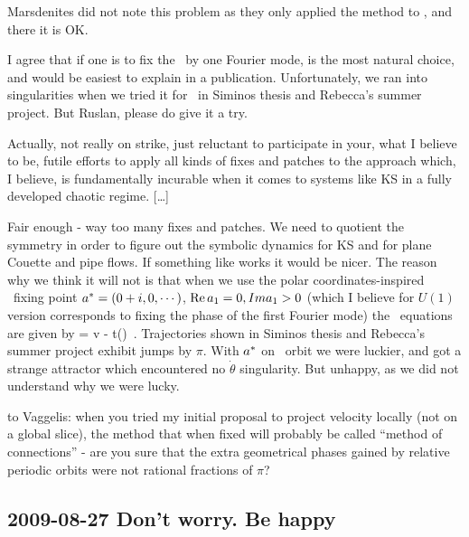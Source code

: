 Marsdenites did not note this problem as they only applied
the method to \reqva, and there it is OK.

I agree that if one is to fix the \slice\ by one Fourier
mode,  is the most natural choice, and would be
easiest to explain in a publication. Unfortunately, we ran
into singularities when we tried it for \CLe\ in Siminos
thesis and
     {Rebecca's summer project}.
But Ruslan, please do give it a try.

\medskip{}
Actually, not really on strike, just reluctant to participate
in your, what I believe to be, futile efforts to apply all
kinds of fixes and patches to the approach which, I believe,
is fundamentally incurable when it comes to systems like KS
in a fully developed chaotic regime. [\dots]

\medskip{} Fair enough - way too many fixes and
patches. We need to quotient the symmetry in order to figure
out the symbolic dynamics for KS and for plane Couette and
pipe flows. If something like  works it would
be nicer. The reason why we think it will not is that when we
use the polar coordinates-inspired \slice\ fixing point
$a^{*}=(0+i,0, \cdots)$, ${\rm Re}\,a_1=0,\;\\Ima_1>0$
(which I believe for $U(1)$ version corresponds to fixing the
phase of the first Fourier mode) the \reducedsp\ equations
are given by
\beq
\dot{\ssp} = v -  t(\ssp)
\,.
Trajectories shown in %
Siminos thesis and
     {Rebecca's summer project}
exhibit jumps by $\pi$. With $a^{*}$ on \reqv\ orbit we
were luckier, and got a strange attractor which encountered
no $\dot{\theta}$ singularity. But unhappy, as we did not
understand why we were lucky.

\medskip{} to Vaggelis: when you tried my initial
proposal to project velocity locally (not on a global slice),
the method that when fixed will probably be called ``method
of connections'' - are you sure that the extra geometrical
phases gained by relative periodic orbits were not rational
fractions of $\pi$?

\subsection{2009-08-27 Don't worry. Be happy}

